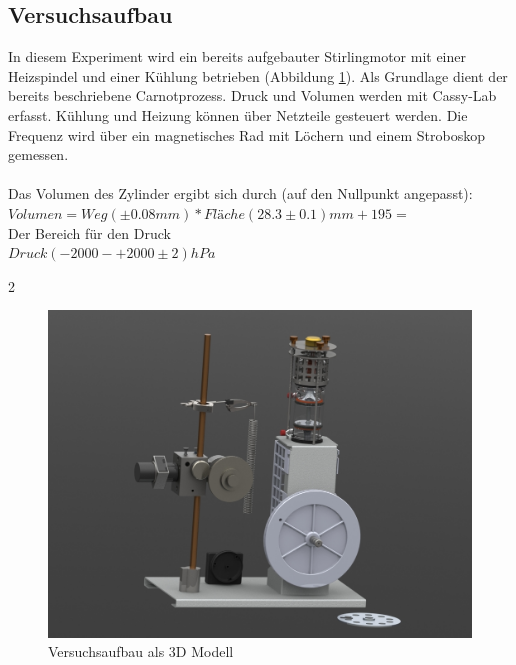 \documentclass[12pt,a4paper]{article}
\begin{document}
\begin{multicols}{2}
\subsection{Versuchsaufbau}
In diesem Experiment wird ein bereits aufgebauter Stirlingmotor mit einer Heizspindel und einer Kühlung betrieben (Abbildung  \ref{fig:stirlingMotor_3D}). Als Grundlage dient der bereits beschriebene Carnotprozess. Druck und Volumen werden mit Cassy-Lab erfasst. Kühlung und Heizung können über Netzteile gesteuert werden. Die Frequenz wird über ein magnetisches Rad mit Löchern und einem Stroboskop gemessen.\\
\\
Das Volumen des Zylinder ergibt sich durch (auf den Nullpunkt angepasst):\\
$Volumen = Weg (\pm 0.08mm) * Fläche (28.3 \pm 0.1)mm + 195 = $\\ %
Der Bereich für den Druck\\
$Druck (-2000 - +2000 \pm 2) hPa$\\

\end {multicols}{2}
\begin{figure}[H]
	\centering

	\includegraphics[scale=0.45]{./data/3D-Model/PS9-model_neutral01.JPG}

	\caption{Versuchsaufbau als 3D Modell}
	\label{fig:stirlingMotor_3D}
\end{figure}
\end{document}
